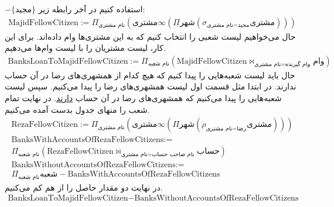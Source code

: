 \begin{enumerate}
    $-\{\text{مجید}\}$
    استفاده کنیم در آخر رابطه زیر:
    \begin{gather*}
        \text{MajidFellowCitizen} := \Pi_{\text{نام مشتری}} (\text{مشتری} \infty (\Pi{\text{شهر}}(\sigma_{\text{نام مشتری}=\text{مجید}}\text{مشتری})))
    \end{gather*}
    حال می‌خواهیم لیست شعبی را انتخاب کنیم که به این مشتری‌ها وام داده‌اند. برای این کار، لیست مشتریان را
    با لیست وام‌ها
    می‌دهیم.
    \begin{gather*}
        \text{BanksLoanToMajidFellowCitizen} := \Pi_{\text{نام شعبه}}(\text{MajidFellowCitizen} \bowtie_{\text{نام مشتری}=\text{وام گیرنده}} \text{وام})
    \end{gather*}
    حال باید لیست شعبه‌هایی را پیدا کنیم که هیچ کدام از همشهری‌های رضا در آن حساب ندارند. در ابتدا مثل قسمت
    اول لیست همشهری‌های رضا را پیدا می‌کنیم. سپس لیست شعبه‌هایی را پیدا می‌کنیم که همشهری‌های رضا در آن حساب
    \underline{دارند}.
    در نهایت تمام شعب را منهای جدول بدست آمده می‌کنیم.
    \begin{gather*}
        \text{RezaFellowCitizen} := \Pi_{\text{نام مشتری}} (\text{مشتری} \infty (\Pi{\text{شهر}}(\rho_{\text{نام مشتری}=\text{رضا}}\text{مشتری})))
        \\
        \text{BanksWithAccountsOfRezaFellowCitizens} :=\\ \Pi_{\text{نام شعبه}}(\text{RezaFellowCitizen} \bowtie_{\text{نام مشتری}=\text{نام صاحب حساب}} \text{حساب})
        \\
        \text{BanksWithoutAccountsOfRezaFellowCitizens} :=\\ \Pi_{\text{نام شعبه}} \text{شعبه} - \text{BanksWithAccountsOfRezaFellowCitizens}
    \end{gather*}
    در نهایت دو مقدار حاصل را از هم کم می‌کنیم.
    \begin{gather*}
        \text{BanksLoanToMajidFellowCitizen} - \text{BanksWithoutAccountsOfRezaFellowCitizens}
    \end{gather*}
\end{enumerate}
